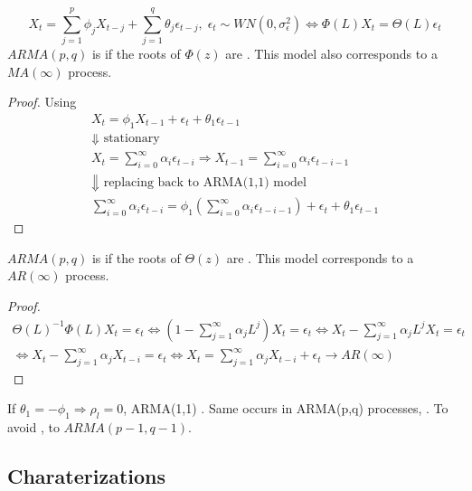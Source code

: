 \begin{equation*}
    X_t = \sum_{j=1}^{p}\phi_jX_{t-j} + \sum_{j=1}^{q}\theta_j\epsilon_{t-j},\; \epsilon_t\sim WN(0,\sigma^2_{\epsilon})
    \Leftrightarrow \Phi(L)X_t = \Theta(L)\epsilon_t
\end{equation*}
$ARMA(p,q)$ is  if the roots of $\Phi(z)$ are .
This model also corresponds to a $MA(\infty)$ process.
\begin{proof}
    Using 
    \begin{gather*}
        X_t = \phi_1 X_{t-1} + \epsilon_t + \theta_1\epsilon_{t-1}\\
        \Downarrow\text{ stationary}\\
        X_t = \sum_{i=0}^{\infty}\alpha_i\epsilon_{t-i} \Rightarrow X_{t-1} = \sum_{i=0}^{\infty}\alpha_i\epsilon_{t-i-1}\\
        \Downarrow \text{ replacing back to ARMA(1,1) model}\\
        \sum_{i=0}^{\infty}\alpha_i\epsilon_{t-i} = \phi_1(\sum_{i=0}^{\infty}\alpha_i\epsilon_{t-i-1})+ \epsilon_t + \theta_1\epsilon_{t-1}
    \end{gather*}
\end{proof}
$ARMA(p,q)$ is  if the roots of $\Theta(z)$ are .
This model corresponds to a $AR(\infty)$ process.
\begin{proof}
    \begin{gather*}
        \Theta(L)^{-1}\Phi(L)X_t = \epsilon_t \Leftrightarrow (1-\sum_{j=1}^{\infty}\alpha_j L^j)X_t = \epsilon_t \Leftrightarrow X_t - \sum_{j=1}^{\infty}\alpha_j L^j X_t = \epsilon_t\\
        \Leftrightarrow X_t  - \sum_{j=1}^{\infty}\alpha_j X_{t-i} = \epsilon_t \Leftrightarrow X_t = \sum_{j=1}^{\infty}\alpha_j X_{t-i} + \epsilon_t \to AR(\infty)
    \end{gather*}
\end{proof}
If $\theta_1 = -\phi_1 \Rightarrow \rho_l = 0$, ARMA(1,1) . 
Same occurs in ARMA(p,q) processes, .
To avoid ,  to $ARMA(p-1,q-1)$.

\subsection{Charaterizations}

